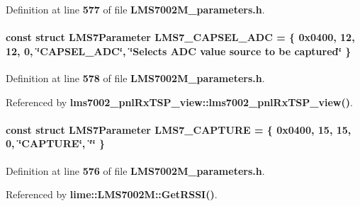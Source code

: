 Definition at line {\bf 577} of file {\bf L\+M\+S7002\+M\+\_\+parameters.\+h}.

\paragraph[{L\+M\+S7\+\_\+\+C\+A\+P\+S\+E\+L\+\_\+\+A\+DC}]{\setlength{\rightskip}{0pt plus 5cm}const struct {\bf L\+M\+S7\+Parameter} L\+M\+S7\+\_\+\+C\+A\+P\+S\+E\+L\+\_\+\+A\+DC = \{ 0x0400, 12, 12, 0, \char`\"{}\+C\+A\+P\+S\+E\+L\+\_\+\+A\+D\+C\char`\"{}, \char`\"{}\+Selects A\+D\+C value source to be captured\char`\"{} \}\hspace{0.3cm}{\ttfamily [static]}}\label{LMS7002M__parameters_8h_ad414abdda5a3899cf55bd0e6d28c8211}


Definition at line {\bf 578} of file {\bf L\+M\+S7002\+M\+\_\+parameters.\+h}.



Referenced by {\bf lms7002\+\_\+pnl\+Rx\+T\+S\+P\+\_\+view\+::lms7002\+\_\+pnl\+Rx\+T\+S\+P\+\_\+view()}.

\paragraph[{L\+M\+S7\+\_\+\+C\+A\+P\+T\+U\+RE}]{\setlength{\rightskip}{0pt plus 5cm}const struct {\bf L\+M\+S7\+Parameter} L\+M\+S7\+\_\+\+C\+A\+P\+T\+U\+RE = \{ 0x0400, 15, 15, 0, \char`\"{}\+C\+A\+P\+T\+U\+R\+E\char`\"{}, \char`\"{}\char`\"{} \}\hspace{0.3cm}{\ttfamily [static]}}\label{LMS7002M__parameters_8h_a6bd7c74a71b142ba7896422a85d26638}


Definition at line {\bf 576} of file {\bf L\+M\+S7002\+M\+\_\+parameters.\+h}.



Referenced by {\bf lime\+::\+L\+M\+S7002\+M\+::\+Get\+R\+S\+S\+I()}.

